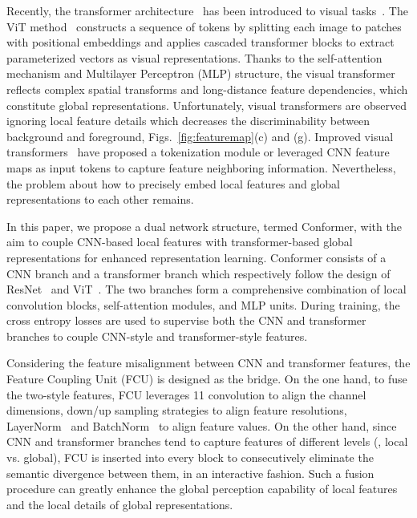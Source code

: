 \documentclass[10pt,twocolumn,letterpaper]{article}
\begin{document}
Recently, the transformer architecture~\cite{Transformer2017} has been introduced to visual tasks~\cite{ViT2020, VT2020,DeiT2020,T2TViT2021,DETR2020,PiT2020,ViTFRCNN2020,SETR2020,TransGAN2021}. The ViT method~\cite{ViT2020} constructs a sequence of tokens by splitting each image to patches with positional embeddings and applies cascaded transformer blocks to extract parameterized vectors as visual representations. Thanks to the self-attention mechanism and Multilayer Perceptron (MLP) structure, the visual transformer reflects complex spatial transforms and long-distance feature dependencies, which constitute global representations. Unfortunately, visual transformers are observed ignoring local feature details which decreases the discriminability between background and foreground, Figs.~\ref{fig:featuremap}(c) and (g). Improved visual transformers~\cite{ViT2020,T2TViT2021} have proposed a tokenization module or leveraged CNN feature maps as input tokens to capture feature neighboring information. Nevertheless, the problem about how to precisely embed local features and global representations to each other remains. 



In this paper, we propose a dual network structure, termed Conformer, with the aim to couple CNN-based local features with transformer-based global representations for enhanced representation learning. 
Conformer consists of a CNN branch and a transformer branch which respectively follow the design of ResNet~\cite{ResNet2016} and ViT~\cite{ViT2020}.
The two branches form a comprehensive combination of local convolution blocks, self-attention modules, and MLP units.
During training, the cross entropy losses are used to supervise both the CNN and transformer branches to couple CNN-style and transformer-style features.

Considering the feature misalignment between CNN and transformer features, the Feature Coupling Unit (FCU) is designed as the bridge.
On the one hand, to fuse the two-style features, FCU leverages 11 convolution to align the channel dimensions, down/up sampling strategies to align feature resolutions, LayerNorm~\cite{LN2016} and BatchNorm~\cite{BN2015} to align feature values. On the other hand, since CNN and transformer branches tend to capture features of different levels (, local vs. global), FCU is inserted into every block to consecutively eliminate the semantic divergence between them, in an interactive fashion. Such a fusion procedure can greatly enhance the global perception capability of local features and the local details of global representations.
\end{document}
